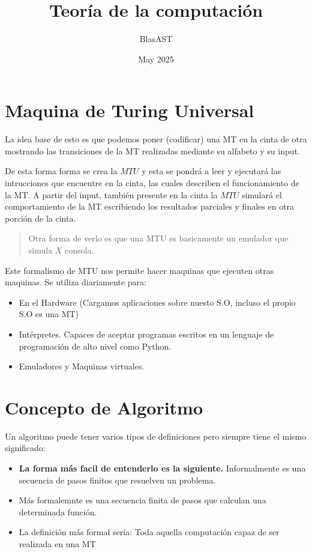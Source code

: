 \documentclass{article}
\title{
    \textbf{Teoría de la computación}
}
\author{BlasAST}
\date{May 2025}
\begin{document}
\maketitle

\newpage

\tableofcontents

\newpage

\section{Maquina de Turing Universal}

La idea base de esto es que podemos poner (codificar) una MT en la
cinta de otra mostrando las transiciones de la MT
realizadas mediante su alfabeto y su input.

De esta forma forma se crea la $MTU$ y esta se pondrá a leer y
ejecutará las intrucciones que encuentre en la cinta, las cuales
describen el funcionamiento de la MT. A partir del input, también
presente en la cinta la $MTU$ simulará el comportamiento de la MT
escribiendo los resultados parciales y finales en otra porción de
la cinta.

\begin{quote}
    Otra forma de verlo es que una MTU es basicamente un emulador
    que simula $X$ consola.
\end{quote}

Este formalismo de MTU nos permite hacer maquinas que ejecuten otras
maquinas. Se utiliza diariamente para:
\begin{itemize}
    \item En el Hardware (Cargamos aplicaciones sobre nuesto S.O,
    incluso el propio S.O es una MT)
    \item Intérpretes. Capaces de aceptar programas escritos
    en un lenguaje de programación de alto nivel como Python.
    \item Emuladores y Maquinas virtuales.
\end{itemize}

\newpage

\section{Concepto de Algoritmo}

Un algoritmo puede tener varios tipos de definiciones pero siempre
tiene el mismo significado:

\begin{itemize}
    \item \textbf{La forma más facil de entenderlo es la siguiente.}
    Informalmente es una secuencia de pasos finitos que resuelven un
    problema.
    \item Más formalemnte es una secuencia finita de pasos que
    calculan una determinada función.
    \item La definición más formal sería: Toda aquella computación
    capaz de ser realizada en una MT
\end{itemize}
\end{document}
